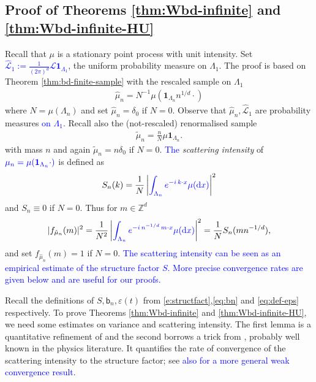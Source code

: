 \documentclass[12pt]{article}
\newcommand{\Leb}{\mathcal{L}}
\newcommand{\bn}{   \mathsf b_{n}}
\newcommand{\1}{\mathbf{1}}
\newcommand{\md}{\mathrm{d}}
\newcommand{\RL}[1]{\textcolor{blue}{#1}}
\newcommand{\dy}[1]{\textcolor{blue}{#1}}
\newcommand{\RL}[1]{#1}%
\newcommand{\dy}[1]{#1}%
\begin{document}
{{{{{\subsection{Proof of Theorems \ref{thm:Wbd-infinite} and \ref{thm:Wbd-infinite-HU}}
\label{sec:proof_Wbd-infinite}
%
{Recall that $ \mu $ is a stationary point process with unit intensity.} Set \dy{$\hat{\Leb}_{1} := \frac{ 1}{(2\pi )^{d}}\Leb \1_{\Lambda_{1}}$}, the uniform probability measure on $\Lambda_1$. The proof is based on Theorem  \ref{thm:bd-finite-sample}  with the rescaled sample on $ \Lambda _{1}$
\begin{align*}
\hat \mu_{n}= N^{-1}\mu (\1_{\Lambda _{n}}n^{1/d}\cdot )
\end{align*}
where $N= \mu (\Lambda _{n})$ and set $\hat{\mu}_n = \delta_0$ if $ N = 0$. Observe that $\hat{\mu}_n,\hat{\Leb}_1$ are probability measures \dy{on $\Lambda_1$}.  Recall also the (not-rescaled) renormalised sample
\begin{align*}
\tilde \mu _{n}= \frac{ n}{N}\mu\1_{\Lambda _{n}}.
\end{align*}
with mass $ n$ and again $\tilde \mu_n = n\delta_0$ if $ N = 0$. \dy{ The}  {\it scattering intensity }  of $\dy{\mu _{n} = \mu(\1_{\Lambda_n}\cdot)}$ is defined as
\begin{align}
\label{eq:scattering}
S_{n}(k)= \frac{ 1}{N} \left|
  \dy{\int_{\Lambda_n}e^{-i\,  k \cdot x}\mu(\md x)}
\right| ^{2}
\end{align}
and $ S_{n}\equiv 0$ if $N  = 0.$   Thus for $ m\in \mathbb{Z} ^{d}$
%
\begin{align}
\label{e:fmu_scat_intensity}
 | f_{ \hat  \mu _{n}}(m) | ^{2} = \frac{ 1}{N^{2}} \left| \dy{\int_{\Lambda_n}e^{-i \, n^{-1/d} \, m \cdot x}\mu(\md x)} \right| ^{2}= \frac{ 1}{N}S_{n}(mn^{-1/d}),
\end{align}
%
 { and set $f_{ \hat  \mu _{n}}(m)  = 1$  {if $N = 0$}.} \dy{The scattering intensity can be seen as an empirical estimate of the structure factor $S$. More precise convergence rates are given below and are useful for our proofs.}

 {Recall the definitions of   $S,\bn, \varepsilon(t)$ from \eqref{e:structfact},\eqref{eq:bn} and \eqref{eq:def-eps} respectively. To prove Theorems \ref{thm:Wbd-infinite}  {and \ref{thm:Wbd-infinite-HU}}, we need some estimates on variance and scattering intensity. The first lemma is a quantitative refinement of \cite[Proposition 2]{martin1980charge} and the second borrows a trick from \cite{hawat2023estimating}, probably well known in the physics literature}. It quantifies the  {rate of convergence of} the scattering intensity to the structure factor; see \RL{also \cite[Theorem 5.1]{coste2021order} for a more general weak convergence result}. 

}}}}}
\end{document}
